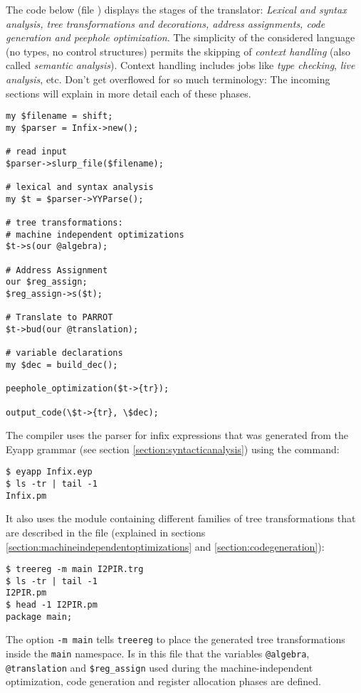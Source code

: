 The code below 
(file ) %
displays
the stages of the translator: \emph{Lexical
and syntax analysis, tree transformations
and decorations,
address assignments, code generation
and peephole optimization}. The simplicity of the 
considered language (no types, no control structures) 
permits the skipping of 
\emph{context handling} (also called \emph{semantic analysis}).
Context handling includes jobs like \emph{type checking}, 
\emph{live analysis}, etc.
Don't get overflowed for so much terminology:
The incoming sections will
explain in more detail each of these phases.
\begin{verbatim}
my $filename = shift;
my $parser = Infix->new(); 

# read input
$parser->slurp_file($filename);

# lexical and syntax analysis
my $t = $parser->YYParse();

# tree transformations:
# machine independent optimizations
$t->s(our @algebra);  

# Address Assignment 
our $reg_assign;
$reg_assign->s($t);

# Translate to PARROT
$t->bud(our @translation);

# variable declarations
my $dec = build_dec();

peephole_optimization($t->{tr});

output_code(\$t->{tr}, \$dec);
\end{verbatim}

The compiler uses the parser for infix expressions
that was generated from the Eyapp grammar  
(see section \ref{section:syntacticanalysis})
using the command:
\begin{verbatim}
$ eyapp Infix.eyp
$ ls -tr | tail -1
Infix.pm
\end{verbatim}
It also uses the module containing different families of tree
transformations that are described in the  file 
(explained in 
sections \ref{section:machineindependentoptimizations} and \ref{section:codegeneration}): 
\begin{verbatim}
$ treereg -m main I2PIR.trg
$ ls -tr | tail -1
I2PIR.pm
$ head -1 I2PIR.pm
package main;
\end{verbatim}
The option \verb|-m main| tells \verb|treereg|
to place the generated tree transformations inside the \verb|main|
namespace. Is in this file that the variables 
\verb|@algebra|, \verb|@translation| and 
\verb|$reg_assign| used during the machine-independent optimization,
code generation and register allocation phases are defined.

